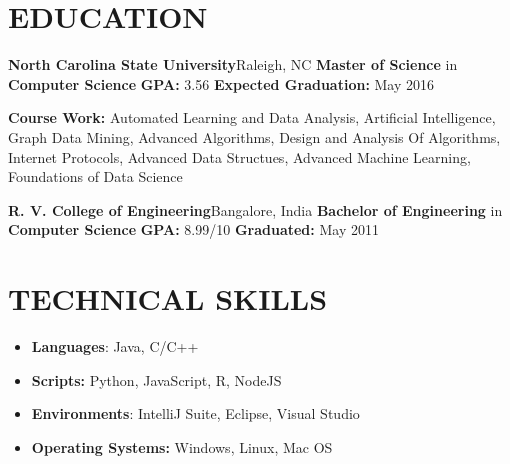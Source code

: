 \documentclass[11pt]{article}
\begin{document}
	\begin{multicols}{2}
		\section*{EDUCATION}
			\vspace{0.2cm}
			{\bfseries \large North Carolina State University}\hfill Raleigh, NC\newline
			{\bfseries Master of Science} in {\bfseries Computer Science} \newline
			{\bfseries GPA:} 3.56 \hfill {\bfseries Expected Graduation:} May 2016\par
			{\bfseries Course Work:} Automated Learning and Data Analysis, Artificial Intelligence, Graph Data Mining, Advanced Algorithms, Design and Analysis Of Algorithms, Internet Protocols, Advanced Data Structues, Advanced Machine Learning, Foundations of Data Science\newline
			\par
			{\bfseries \large R. V. College of Engineering}\hfill Bangalore, India\newline
			{\bfseries Bachelor of Engineering} in {\bfseries Computer Science} \newline
			{\bfseries GPA:} 8.99/10 \hfill {\bfseries Graduated:} May 2011

		\section*{TECHNICAL SKILLS}
			\begin{itemize}[nolistsep,leftmargin=*]
				\item \textbf{Languages}: Java, C/C++
				\item \textbf{Scripts:} Python, JavaScript, R, NodeJS
				\item \textbf{Environments}: IntelliJ Suite, Eclipse, Visual Studio
				\item \textbf{Operating Systems:} Windows, Linux, Mac OS
			\end{itemize}


\end{multicols}
\end{document}
